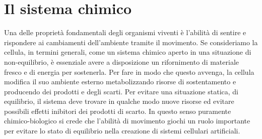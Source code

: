 \chapter{Il sistema chimico}
\vspace{0.5cm}
\label{cha:789}

Una delle proprietà fondamentali degli organismi viventi è l'abilità di sentire e rispondere ai cambiamenti dell'ambiente tramite il movimento. 
Se consideriamo la cellula, in termini generali, come un sistema chimico aperto in una situazione di non-equilibrio, è essenziale avere a disposizione un rifornimento di materiale fresco e di energia per sostenerla. Per fare in modo che questo avvenga, la cellula modifica il suo ambiente esterno metabolizzando risorse di sostentamento e producendo dei prodotti e degli scarti. Per evitare una situazione statica, di equilibrio, il sistema deve trovare in qualche modo nuove risorse ed evitare possibili effetti inibitori dei prodotti di scarto. In questo senso puramente chimico-biologico si crede che l'abilità di movimento giochi un ruolo importante per evitare lo stato di equilibrio nella creazione di sistemi cellulari artificiali. \cite{doi:10.1021/ja0706955}

